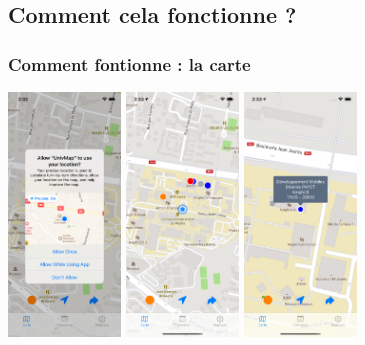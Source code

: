 \documentclass{beamer}
\begin{document}
\subsection{Comment cela fonctionne ?}

  \begin{frame}
    \frametitle{Comment fontionne : la carte}
    \begin{center}
      \includegraphics[width=30mm, scale=0.5]{allowUserLocation.png}
      \includegraphics[width=30mm, scale=0.5]{map.png}
      \includegraphics[width=30mm, scale=0.5]{point_bleu.png}
    \end{center}
  \end{frame}
\end{document}
